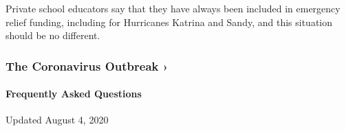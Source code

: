 Private school educators say that they have always been included in
emergency relief funding, including for Hurricanes Katrina and Sandy,
and this situation should be no different.

\href{https://www.nytimes3xbfgragh.onion/news-event/coronavirus?action=click\&pgtype=Article\&state=default\&region=MAIN_CONTENT_3\&context=storylines_faq}{}

\hypertarget{the-coronavirus-outbreak-}{%
\subsubsection{The Coronavirus Outbreak
›}\label{the-coronavirus-outbreak-}}

\hypertarget{frequently-asked-questions}{%
\paragraph{Frequently Asked
Questions}\label{frequently-asked-questions}}

Updated August 4, 2020

